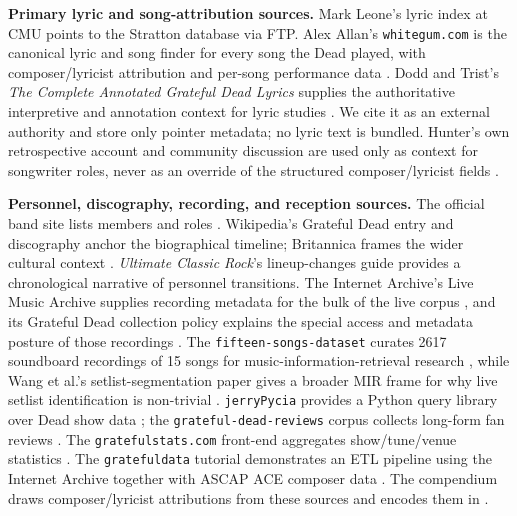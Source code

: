 \documentclass[
]{article}
\begin{document}
\textbf{Primary lyric and song-attribution sources.} Mark Leone's lyric
index at CMU \citep{cmu_leone_lyrics} points to the Stratton database
via FTP. Alex Allan's \texttt{whitegum.com} is the canonical lyric and
song finder for every song the Dead played, with composer/lyricist
attribution and per-song performance data \citep{whitegum_alex_allan}.
Dodd and Trist's \emph{The Complete Annotated Grateful Dead Lyrics}
supplies the authoritative interpretive and annotation context for lyric
studies \citep{dodd_annotated_lyrics}. We cite it as an external
authority and store only pointer metadata; no lyric text is bundled.
Hunter's own retrospective account and community discussion are used
only as context for songwriter roles, never as an override of the
structured composer/lyricist fields
\citep{rolling_stone_robert_hunter_interview, reddit_lyrics_attribution}.

\textbf{Personnel, discography, recording, and reception sources.} The
official band site lists members and roles \citep{dead_net_official}.
Wikipedia's Grateful Dead entry \citep{wikipedia_gd} and discography
\citep{wikipedia_discography} anchor the biographical timeline;
Britannica frames the wider cultural context \citep{britannica_gd}.
\emph{Ultimate Classic Rock}'s lineup-changes guide
\citep{ucr_lineup_changes} provides a chronological narrative of
personnel transitions. The Internet Archive's Live Music Archive
supplies recording metadata for the bulk of the live corpus
\citep{internet_archive_lma}, and its Grateful Dead collection policy
explains the special access and metadata posture of those recordings
\citep{internet_archive_gd_collection_policy}. The
\texttt{fifteen-songs-dataset} curates 2617 soundboard recordings of 15
songs for music-information-retrieval research
\citep{fifteen_songs_dataset}, while Wang et al.'s setlist-segmentation
paper gives a broader MIR frame for why live setlist identification is
non-trivial \citep{wang_setlist_segmentation}. \texttt{jerryPycia}
provides a Python query library over Dead show data \citep{jerry_pycia};
the \texttt{grateful-dead-reviews} corpus collects long-form fan reviews
\citep{gd_reviews_corpus}. The \texttt{gratefulstats.com} front-end
aggregates show/tune/venue statistics \citep{grateful_stats}. The
\texttt{gratefuldata} tutorial demonstrates an ETL pipeline using the
Internet Archive together with ASCAP ACE composer data
\citep{grateful_data_tutorial}. The compendium draws composer/lyricist
attributions from these sources and encodes them in
.
\end{document}
